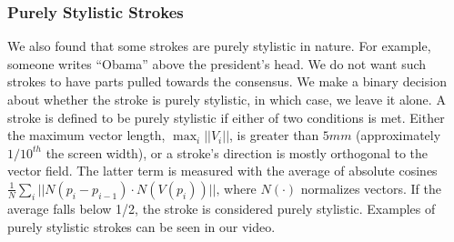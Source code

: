 \subsubsection{Purely Stylistic Strokes}

We also found that some strokes are purely stylistic in nature. For example, someone writes ``Obama'' above the president's head. We do not want such strokes to have parts pulled towards the consensus. We make a binary decision about whether the stroke is purely stylistic, in which case, we leave it alone. A stroke is defined to be purely stylistic if either of two conditions is met. Either the maximum vector length, $\max_i||V_i||$, is greater than $5mm$ (approximately $1/10^{th}$ the screen width), or a stroke's direction is mostly orthogonal to the vector field. The latter term is measured with the average of absolute cosines $\frac{1}{N}\sum_i||N(p_i - p_{i-1}) \cdot N(V(p_i))||\textrm{,}$ where $N(\cdot)$ normalizes vectors. If the average falls below 1/2, the stroke is considered purely stylistic. Examples of purely stylistic strokes can be seen in our video.









